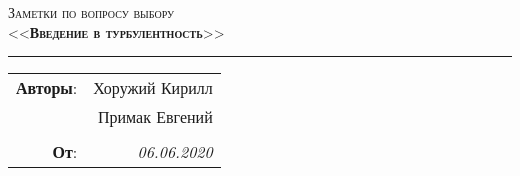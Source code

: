 \begin{center}
    \LARGE \textsc{Заметки по вопросу выбору \\ <<\textbf{Введение в турбулентность}>>}
\end{center}

\hrule

\phantom{42}

\begin{flushright}
    \begin{tabular}{rr}
        \textbf{Авторы}: 
        & Хоружий Кирилл \\
        & Примак Евгений \\
        &\\
        \textbf{От}: &
        \textit{06.06.2020}\\
    \end{tabular}
\end{flushright}

\phantom{42}

\phantom{42}

\thispagestyle{empty}
\tableofcontents
\newpage